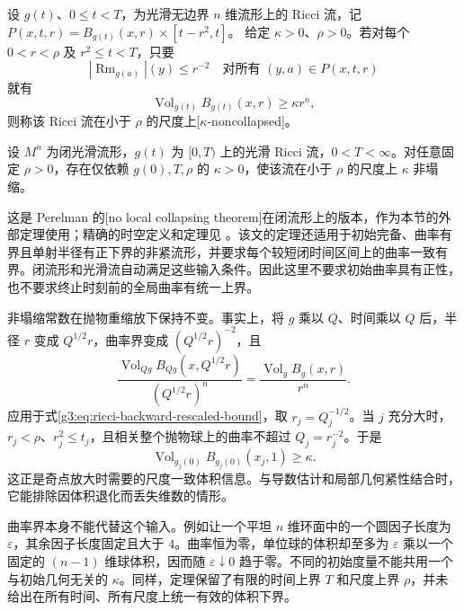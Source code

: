 \begin{definition}\label{g3:def:kappa-noncollapsed}
	设 \(g(t)\)、\(0\le t<T\)，为光滑无边界 \(n\) 维流形上的 Ricci 流，记 \(P(x,t,r)=B_{g(t)}(x,r)\times[t-r^2,t]\)。
	给定 \(\kappa>0\)、\(\rho>0\)。若对每个 \(0<r<\rho\) 及 \(r^2\le t<T\)，只要
	\[
		|\operatorname{Rm}_{g(a)}|(y)\le r^{-2}
		\quad\text{对所有 }(y,a)\in P(x,t,r)
	\]
	就有
	\begin{equation}\label{g3:eq:ricci-kappa-volume}
		\operatorname{Vol}_{g(t)}B_{g(t)}(x,r)\ge\kappa r^n,
	\end{equation}
	则称该 Ricci 流在小于 \(\rho\) 的尺度上[\(\kappa\)-noncollapsed]。
\end{definition}

\begin{theorem}[有限时间非塌缩定理]\label{g3:thm:ricci-no-local-collapsing}
	设 \(M^n\) 为闭光滑流形，\(g(t)\) 为 \([0,T)\) 上的光滑 Ricci 流，\(0<T<\infty\)。对任意固定 \(\rho>0\)，存在仅依赖 \(g(0),T,\rho\) 的 \(\kappa>0\)，使该流在小于 \(\rho\) 的尺度上 \(\kappa\) 非塌缩。
\end{theorem}

这是 Perelman 的[no local collapsing theorem]在闭流形上的版本，作为本节的外部定理使用；精确的时空定义和定理见 \cite[Definition~26.1、Theorem~26.2，第2645页]{KleinerLott2008Perelman}。该文的定理还适用于初始完备、曲率有界且单射半径有正下界的非紧流形，并要求每个较短闭时间区间上的曲率一致有界。闭流形和光滑流自动满足这些输入条件。因此这里不要求初始曲率具有正性，也不要求终止时刻前的全局曲率有统一上界。

\ProseParagraphBreak
非塌缩常数在抛物重缩放下保持不变。事实上，将 \(g\) 乘以 \(Q\)、时间乘以 \(Q\) 后，半径 \(r\) 变成 \(Q^{1/2}r\)，曲率界变成 \((Q^{1/2}r)^{-2}\)，且
\[
	\frac{\operatorname{Vol}_{Qg}B_{Qg}(x,Q^{1/2}r)}{(Q^{1/2}r)^n}
	=\frac{\operatorname{Vol}_gB_g(x,r)}{r^n}.
\]
应用于式\eqref{g3:eq:ricci-backward-rescaled-bound}，取 \(r_j=Q_j^{-1/2}\)。当 \(j\) 充分大时，\(r_j<\rho\)、\(r_j^2\le t_j\)，且相关整个抛物球上的曲率不超过 \(Q_j=r_j^{-2}\)。于是
\begin{equation}\label{g3:eq:rescaled-unit-ball-volume}
	\operatorname{Vol}_{g_j(0)}B_{g_j(0)}(x_j,1)\ge\kappa.
\end{equation}
这正是奇点放大时需要的尺度一致体积信息。与导数估计和局部几何紧性结合时，它能排除因体积退化而丢失维数的情形。

\ProseParagraphBreak
曲率界本身不能代替这个输入。例如让一个平坦 \(n\) 维环面中的一个圆因子长度为 \(\varepsilon\)，其余因子长度固定且大于 \(4\)。曲率恒为零，单位球的体积却至多为 \(\varepsilon\) 乘以一个固定的 \((n-1)\) 维球体积，因而随 \(\varepsilon\downarrow0\) 趋于零。不同的初始度量不能共用一个与初始几何无关的 \(\kappa\)。同样，定理保留了有限的时间上界 \(T\) 和尺度上界 \(\rho\)，并未给出在所有时间、所有尺度上统一有效的体积下界。
